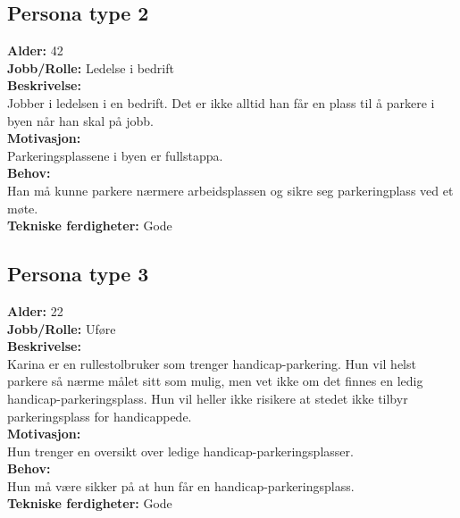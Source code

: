\documentclass[12pt]{article}
\begin{document}
    \subsection{Persona type 2}
    \textbf{Alder:} 42\\\textbf{Jobb/Rolle:} Ledelse i bedrift\\\textbf{Beskrivelse:}\\Jobber i ledelsen i en bedrift. Det er ikke alltid han får en plass til å parkere i byen når han skal på jobb.\\\textbf{Motivasjon:}\\ Parkeringsplassene i byen er fullstappa.\\\textbf{Behov:}\\Han må kunne parkere nærmere arbeidsplassen og sikre seg parkeringplass ved et møte.\\\textbf{Tekniske ferdigheter:} Gode

    \subsection{Persona type 3}
    \textbf{Alder:} 22\\\textbf{Jobb/Rolle:} Uføre\\\textbf{Beskrivelse:}\\Karina er en rullestolbruker som trenger handicap-parkering. Hun vil helst parkere så nærme målet sitt som mulig, men vet ikke om det finnes en ledig handicap-parkeringsplass. Hun vil heller ikke risikere at stedet ikke tilbyr parkeringsplass for handicappede.\\\textbf{Motivasjon:}\\Hun trenger en oversikt over ledige handicap-parkeringsplasser.\\\textbf{Behov:}\\Hun må være sikker på at hun får en handicap-parkeringsplass.\\\textbf{Tekniske ferdigheter:} Gode
\end{document}
